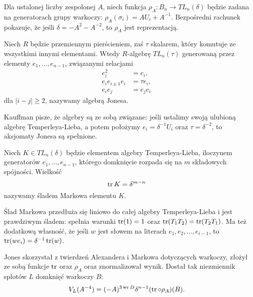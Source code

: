 Dla ustalonej liczby zespolonej $A$, niech funkcja $\rho_A \colon B_n \to TL_n(\delta)$ będzie zadana na generatorach grupy warkoczy: $\rho_A(\sigma_i) = AU_i + A^{-1}$.
Bezpośredni rachunek pokazuje, że jeśli $\delta = -A^2-A^{-2}$, to $\rho_A$ jest reprezentacją.

\begin{definition}
%
    Niech $R$ będzie przemiennym pierścieniem, zaś $\tau$ skalarem, który komutuje ze wszystkimi innymi elementami.
    Wtedy $R$-algebrę $TL_n(\tau)$ generowaną przez elementy $e_1, \ldots, e_{n-1}$, związanymi relacjami
    \begin{align}
        e_i^2 & = e_i, \\
        e_i e_{i \pm 1} e_i & = \tau e_i, \\
        e_i e_j & = e_j e_i
    \end{align}
    dla $|i-j| \ge 2$, nazywamy algebrą Jonesa.
\end{definition}

Kauffman pisze, że algebry są ze sobą związane: jeśli ustalimy swoją ulubioną algebrę Temperleya-Lieba, a potem położymy $e_i = \delta^{-1} U_i$ oraz $\tau = \delta^{-2}$, to aksjomaty Jonesa są spełnione.

\begin{definition}
%
    Niech $K \in TL_n(\delta)$ będzie elementem algebry Temperleya-Lieba, iloczynem generatorów $e_1, \ldots, e_{n-1}$, którego domknięcie rozpada się na $m$ składowych spójności.
    Wielkość
    \begin{equation}
        \operatorname{tr} K = \delta^{m-n}
    \end{equation}
    nazywamy śladem Markowa elementu $K$.
\end{definition}

Ślad Markowa przedłuża się liniowo do całej algebry Temperleya-Lieba i jest prawdziwym śladem: spełnia warunki $\operatorname{tr} (1) = 1$ oraz $\operatorname{tr} (T_1T_2) = \operatorname{tr} (T_2T_1)$.
Ma też dodatkową własność, że jeśli $w$ jest słowem na literach $e_1, e_2, \ldots, e_{i-1}$, to $\operatorname{tr}(we_i) = \delta^{-1} \operatorname{tr} (w)$.

Jones skorzystał z twierdzeń Alexandera i Markowa dotyczących warkoczy, złożył ze sobą funkcje $\operatorname{tr}$ oraz $\rho_A$ oraz znormalizował wynik.
%
%
Dostał tak niezmiennik splotów $L$ domknięć warkoczy $B$:
\begin{equation}
    V_L(A^{-4}) = (-A)^{3 \operatorname{wr} D} \delta^{n-1} (\operatorname{tr} \circ \rho_A)(B).
\end{equation}


